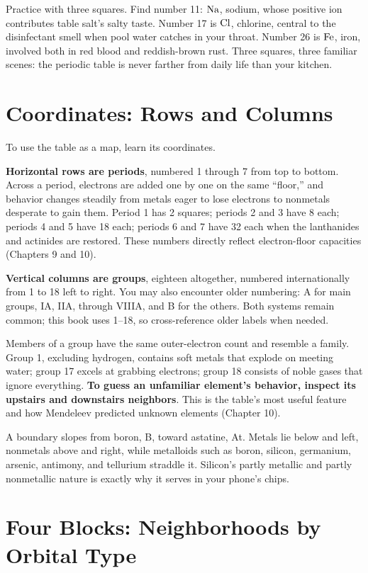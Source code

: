 Practice with three squares. Find number 11: $\mathrm{Na}$, sodium, whose positive ion contributes table salt's salty taste. Number 17 is $\mathrm{Cl}$, chlorine, central to the disinfectant smell when pool water catches in your throat. Number 26 is $\mathrm{Fe}$, iron, involved both in red blood and reddish-brown rust. Three squares, three familiar scenes: the periodic table is never farther from daily life than your kitchen.

\section{Coordinates: Rows and Columns}

To use the table as a map, learn its coordinates.

\textbf{Horizontal rows are periods}, numbered 1 through 7 from top to bottom. Across a period, electrons are added one by one on the same ``floor,'' and behavior changes steadily from metals eager to lose electrons to nonmetals desperate to gain them. Period 1 has 2 squares; periods 2 and 3 have 8 each; periods 4 and 5 have 18 each; periods 6 and 7 have 32 each when the lanthanides and actinides are restored. These numbers directly reflect electron-floor capacities (Chapters 9 and 10).

\textbf{Vertical columns are groups}, eighteen altogether, numbered internationally from 1 to 18 left to right. You may also encounter older numbering: A for main groups, IA, IIA, through VIIIA, and B for the others. Both systems remain common; this book uses 1--18, so cross-reference older labels when needed.

Members of a group have the same outer-electron count and resemble a family. Group 1, excluding hydrogen, contains soft metals that explode on meeting water; group 17 excels at grabbing electrons; group 18 consists of noble gases that ignore everything. \textbf{To guess an unfamiliar element's behavior, inspect its upstairs and downstairs neighbors}. This is the table's most useful feature and how Mendeleev predicted unknown elements (Chapter 10).

A boundary slopes from boron, B, toward astatine, At. Metals lie below and left, nonmetals above and right, while metalloids such as boron, silicon, germanium, arsenic, antimony, and tellurium straddle it. Silicon's partly metallic and partly nonmetallic nature is exactly why it serves in your phone's chips.

\section{Four Blocks: Neighborhoods by Orbital Type}

